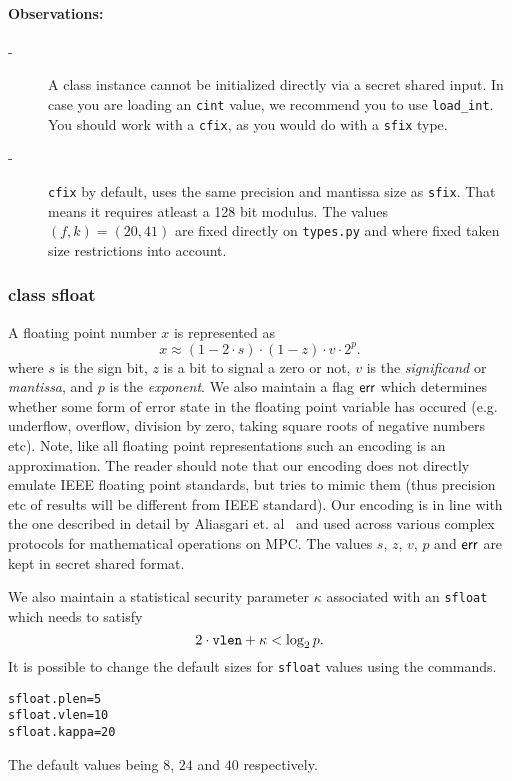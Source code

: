 	\paragraph{Observations:}
	\begin{description}
	\item[-] A class instance cannot be initialized directly via a secret shared input. 
	In case you are loading an \verb|cint| value, we recommend you to use \verb|load_int|. 
	You should work with a \verb|cfix|, as you would do with a \verb|sfix| type.
	\item[-]\verb|cfix| by default, uses the same precision and mantissa size as \verb|sfix|. 
	That means it requires atleast a 128 bit modulus. 
    The values $(f,k)=(20,41)$ are fixed directly on \verb|types.py| and where fixed taken size restrictions into account.
	\end{description}

\subsubsection{class sfloat}

\noindent
A floating point number $x$ is represented as 
\[
			x\approx (1-2 \cdot s)\cdot (1-z)\cdot v\cdot 2^{p}.
\]
where $s$ is the sign bit,
$z$ is a bit to signal a zero or not,
$v$ is the \textit{significand} or \textit{mantissa},
and $p$ is the \textit{exponent}.
We also maintain a flag $\mathsf{err}$ which determines whether
some form of error state in the floating point variable
has occured (e.g. underflow, overflow, division by zero, taking
square roots of negative numbers etc).
Note, like all floating point representations such an encoding is 
an approximation.
The reader should note that our encoding does not directly
emulate IEEE floating point standards, but tries to mimic them
(thus precision etc of results will be different from IEEE
standard).
Our encoding is in line with the one described in detail 
by Aliasgari et. al~\cite{ABZS13} and used across various 
complex protocols for mathematical operations on MPC.
The values $s$, $z$, $v$, $p$ and $\mathsf{err}$ are kept in
secret shared format.

We also maintain a statistical security parameter $\kappa$ 
associated with an \verb+sfloat+ which needs
to satisfy
\[ 2 \cdot \verb+vlen+  + \kappa < \log_2 p. \]
It is possible to change the default sizes for \verb|sfloat| values using the commands.
\begin{lstlisting}
sfloat.plen=5 
sfloat.vlen=10
sfloat.kappa=20
\end{lstlisting}
The default values being $8$, $24$ and $40$ respectively.

